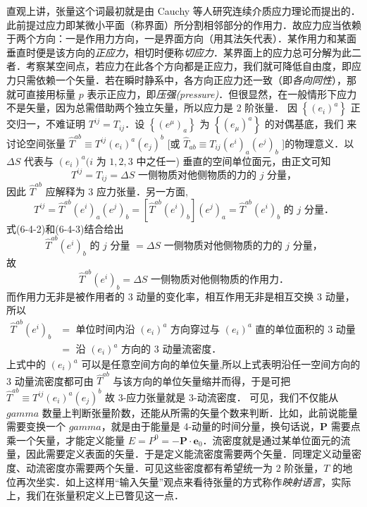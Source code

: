 直观上讲，张量这个词最初就是由 Cauchy 等人研究连续介质应力理论而提出的．此前提过应力即某微小平面（称界面）所分割相邻部分的作用力．故应力应当依赖于两个方向：一是作用力方向，一是界面方向（用其法矢代表）．某作用力和某面垂直时便是该方向的\textit{正应力}，相切时便称\textit{切应力}．某界面上的应力总可分解为此二者．考察某空间点，若应力在此各个方向都是正应力，我们就可降低自由度，即应力只需依赖一个矢量．若在瞬时静系中，各方向正应力还一致（即\textit{各向同性}），那就可直接用标量 $p$ 表示正应力，即\textit{压强(pressure)}．但很显然，在一般情形下应力不是矢量，因为总需借助两个独立矢量，所以应力是 2 阶张量．
因 $\left\{\left(e_i\right)^a\right\}$ 正交归一，不难证明 $T^{i j}=T_{i j}$．设 $\left\{\left(e^\mu\right)_a\right\}$ 为 $\left\{\left(e_\mu\right)^a\right\}$ 的对偶基底，我们 来讨论空间张量 $\hat{T}^{a b} \equiv T^{i j}\left(e_i\right)^a\left(e_j\right)^b$ [或 $\hat{T}_{a b} \equiv T_{i j}\left(e^i\right)_a\left(e^j\right)_b$ ]的物理意义．以 $\Delta S$ 代表与 $\left(e_i\right)^a(i$ 为 $1,2,3$ 中之任一) 垂直的空间单位面元，由正文可知
\[
T^{i j}=T_{i j}=\Delta S \text { 一侧物质对他侧物质的力的 } j \text { 分量，}
\]
因此 $\hat{T}^{a b}$ 应解释为 3 应力张量．另一方面,
\[
T^{i j}=\hat{T}^{a b}\left(e^i\right)_a\left(e^j\right)_b=\left[\hat{T}^{a b}\left(e^i\right)_b\right]\left(e^j\right)_a=\hat{T}^{a b}\left(e^i\right)_b \text { 的 } j \text { 分量．}
\]
式(6-4-2)和(6-4-3)结合给出
\[
\hat{T}^{a b}\left(e^i\right)_b \text { 的 } j \text { 分量 }=\Delta S \text { 一侧物质对他侧物质的力的 } j \text { 分量，}
\]
故
\[
\hat{T}^{a b}\left(e^i\right)_b=\Delta S \text { 一侧物质对他侧物质的作用力．}
\]
而作用力无非是被作用者的 3 动量的变化率，相互作用无非是相互交换 3 动量，所以
\[
\begin{aligned}
\hat{T}^{a b}\left(e^i\right)_b & =\text { 单位时间内沿 }\left(e_i\right)^a \text { 方向穿过与 }\left(e_i\right)^a \text { 直的单位面积的 } 3 \text { 动量 } \\
& =\text { 沿 }\left(e_i\right)^a \text { 方向的 } 3 \text { 动量流密度．}
\end{aligned}
\]
上式中的 $\left(e_i\right)^a$ 可以是任意空间方向的单位矢量,所以上式表明沿任一空间方向的 3 动量流密度都可由 $\hat{T}^{a b}$ 与该方向的单位矢量缩并而得，于是可把 $\hat{T}^{a b} \equiv T^{i j}\left(e_i\right)^a\left(e_j\right)^b$
故 3-应力张量就是 3-动流密度．
可见，我们不仅能从 $gamma$ 数量上判断张量阶数，还能从所需的矢量个数来判断．比如，此前说能量需要变换一个 $gamma$，就是由于能量是 4-动量的时间分量，换句话说，$\bm P$ 需要点乘一个矢量，才能定义能量 $E=P^0=-\bm P\cdot \bm e_0$．流密度就是通过某单位面元的流量，因此需要定义表面的矢量．于是定义能流密度需要两个矢量．同理定义动量密度、动流密度亦需要两个矢量．可见这些密度都有希望统一为 2 阶张量，$T$ 的地位再次坐实．如上这样用“输入矢量”观点来看待张量的方式称作\textit{映射语言}，实际上，我们在张量积定义上已瞥见这一点． 

